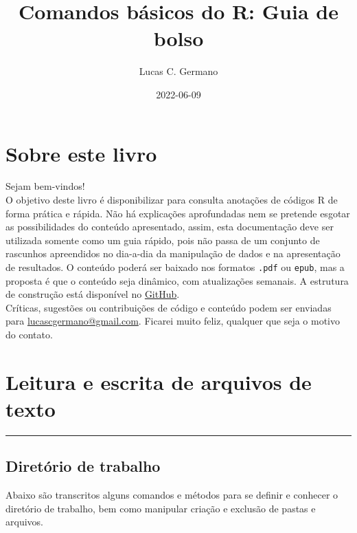 \documentclass[
]{book}
\title{Comandos básicos do R: Guia de bolso}
\author{Lucas C. Germano}
\date{2022-06-09}
\theoremstyle{definition}
\theoremstyle{definition}
\theoremstyle{definition}
\theoremstyle{definition}
\theoremstyle{remark}
\begin{document}
\maketitle

{
\setcounter{tocdepth}{1}
\tableofcontents
}
\hypertarget{sobre-este-livro}{%
\chapter*{Sobre este livro}\label{sobre-este-livro}}

Sejam bem-vindos!\\
O objetivo deste livro é disponibilizar para consulta anotações de códigos R de forma prática e rápida. Não há explicações aprofundadas nem se pretende esgotar as possibilidades do conteúdo apresentado, assim, esta documentação deve ser utilizada somente como um guia rápido, pois não passa de um conjunto de rascunhos apreendidos no dia-a-dia da manipulação de dados e na apresentação de resultados. O conteúdo poderá ser baixado nos formatos \texttt{.pdf} ou \texttt{epub}, mas a proposta é que o conteúdo seja dinâmico, com atualizações semanais. A estrutura de construção está disponível no \href{https://github.com/lucascgmermano/guia_de_bolso.git}{GitHub}.\\
Críticas, sugestões ou contribuições de código e conteúdo podem ser enviadas para \url{lucascgermano@gmail.com}. Ficarei muito feliz, qualquer que seja o motivo do contato.

\hypertarget{leitura-e-escrita-de-arquivos-de-texto}{%
\chapter{Leitura e escrita de arquivos de texto}\label{leitura-e-escrita-de-arquivos-de-texto}}

\begin{center}\rule{0.5\linewidth}{0.5pt}\end{center}

\hypertarget{diretuxf3rio-de-trabalho}{%
\section{Diretório de trabalho}\label{diretuxf3rio-de-trabalho}}

Abaixo são transcritos alguns comandos e métodos para se definir e conhecer o diretório de trabalho, bem como manipular criação e exclusão de pastas e arquivos.
\end{document}
